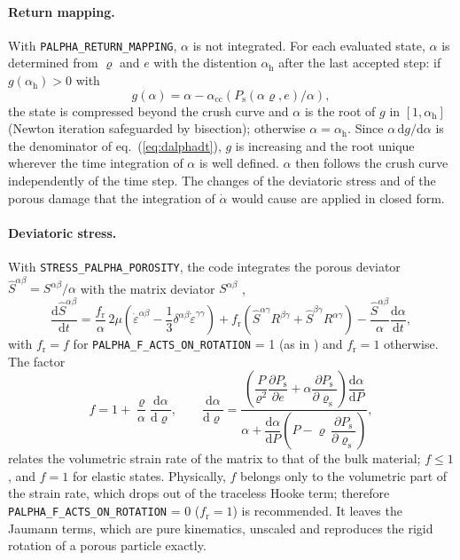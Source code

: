 \documentclass[10pt,fleqn,twoside]{article}
\newcommand{\sw}[1]{\texttt{#1}}
\newcommand{\dd}{\mathrm{d}}
\begin{document}
\paragraph{Return mapping.} With \sw{PALPHA\_RETURN\_MAPPING}, $\alpha$ is not integrated. For each evaluated state,
$\alpha$ is determined from $\varrho$ and $e$ with the distention $\alpha_\mathrm{h}$ after the last accepted step:
if $g(\alpha_\mathrm{h}) > 0$ with
\begin{equation}
 g(\alpha) = \alpha - \alpha_\mathrm{cc}\!\left(P_\mathrm{s}(\alpha\varrho, e)/\alpha\right),
\end{equation}
the state is compressed beyond the crush curve and $\alpha$ is the root of $g$ in $[1, \alpha_\mathrm{h}]$ (Newton
iteration safeguarded by bisection); otherwise $\alpha = \alpha_\mathrm{h}$. Since $\alpha\,\dd g/\dd\alpha$ is the
denominator of eq.~(\ref{eq:dalphadt}), $g$ is increasing and the root unique wherever the time integration of
$\alpha$ is well defined. $\alpha$ then follows the crush curve independently of the time step. The changes of the
deviatoric stress and of the porous damage that the integration of $\dot\alpha$ would cause are applied in closed form.

\paragraph{Deviatoric stress.} With \sw{STRESS\_PALPHA\_POROSITY}, the code integrates the porous deviator
$\hat S^{\alpha\beta} = S^{\alpha\beta}/\alpha$ with the matrix deviator $S^{\alpha\beta}$
\citep[eqs.~45, 49]{2008Icar..198..242J},
\begin{equation}
 \frac{\dd\hat S^{\alpha\beta}}{\dd t} = \frac{f_\mathrm{r}}{\alpha}\,2\mu\left(\dot\varepsilon^{\alpha\beta}
   - \frac{1}{3}\delta^{\alpha\beta}\dot\varepsilon^{\gamma\gamma}\right)
   + f_\mathrm{r}\left(\hat S^{\alpha\gamma}R^{\beta\gamma} + \hat S^{\beta\gamma}R^{\alpha\gamma}\right)
   - \frac{\hat S^{\alpha\beta}}{\alpha}\frac{\dd\alpha}{\dd t},
\end{equation}
with $f_\mathrm{r} = f$ for \sw{PALPHA\_F\_ACTS\_ON\_ROTATION} = 1 (as in \citealt{2008Icar..198..242J}) and
$f_\mathrm{r} = 1$ otherwise. The factor
\begin{equation}
 f = 1 + \frac{\varrho}{\alpha}\frac{\dd\alpha}{\dd\varrho}, \qquad
 \frac{\dd\alpha}{\dd\varrho} = \frac{\left(\dfrac{P}{\varrho^2}\dfrac{\partial P_\mathrm{s}}{\partial e}
   + \alpha\dfrac{\partial P_\mathrm{s}}{\partial\varrho_\mathrm{s}}\right)\dfrac{\dd\alpha}{\dd P}}
   {\alpha + \dfrac{\dd\alpha}{\dd P}\left(P - \varrho\,\dfrac{\partial P_\mathrm{s}}{\partial\varrho_\mathrm{s}}\right)},
\end{equation}
relates the volumetric strain rate of the matrix to that of the bulk material; $f \leq 1$, and $f = 1$ for elastic
states. Physically, $f$ belongs only to the volumetric part of the strain rate, which drops out of the traceless Hooke
term; therefore \sw{PALPHA\_F\_ACTS\_ON\_ROTATION} = 0 ($f_\mathrm{r} = 1$) is recommended. It leaves the Jaumann
terms, which are pure kinematics, unscaled and reproduces the rigid rotation of a porous particle exactly.
\end{document}
